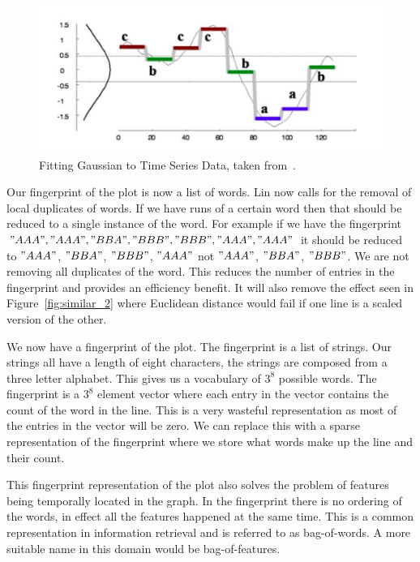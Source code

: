 \begin{figure}[h!]
    \centering
    \includegraphics[width=\textwidth]{images/similiarty_normalise.png}
    \caption{Fitting Gaussian to Time Series Data, taken from~\cite{structural_similarity}.}
    \label{fig:gaussian_plot}
\end{figure}

Our fingerprint of the plot is now a list of words.  Lin now calls for the removal of local duplicates of words.  If we have runs of a certain word then that should be reduced to a single instance of the word.  For example if we have the fingerprint $"AAA", "AAA", "BBA", "BBB", "BBB", "AAA", "AAA"$ it should be reduced to $"AAA"$, $"BBA"$, $"BBB"$, $"AAA"$ not $"AAA"$, $"BBA"$, $"BBB"$.  We are not removing all duplicates of the word.  This reduces the number of entries in the fingerprint and provides an efficiency benefit.  It will also remove the effect seen in Figure~\ref{fig:similar_2} where Euclidean distance would fail if one line is a scaled version of the other.

We now have a fingerprint of the plot.  The fingerprint is a list of strings.  Our strings all have a length of eight characters, the strings are composed from a three letter alphabet.  This gives us a vocabulary of $3^8$ possible words.  The fingerprint is a $3^8$ element vector where each entry in the vector contains the count of the word in the line.  This is a very wasteful representation as most of the entries in the vector will be zero.  We can replace this with a sparse representation of the fingerprint where we store what words make up the line and their count.

This fingerprint representation of the plot also solves the problem of features being temporally located in the graph.  In the fingerprint there is no ordering of the words, in effect all the features happened at the same time.  This is a common representation in information retrieval and is referred to as bag-of-words.  A more suitable name in this domain would be bag-of-features.

